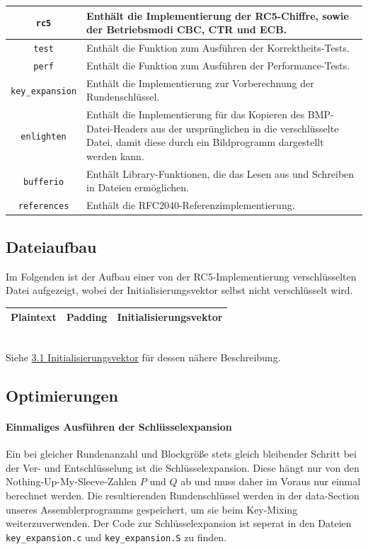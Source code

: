 \documentclass[course=erap]{aspdoc}
\begin{document}
\begin{center}
\begin{tabular}{ |c|m{10cm}| }
\hline
\texttt{rc5} & Enthält die Implementierung der RC5-Chiffre, sowie der Betriebsmodi CBC, CTR und ECB. \\
\hline
\texttt{test} & Enthält die Funktion zum Ausführen der Korrektheits-Tests. \\
\hline
\texttt{perf} & Enthält die Funktion zum Ausführen der Performance-Tests. \\
\hline
\texttt{key\_expansion} & Enthält die Implementierung zur Vorberechnung der Rundenschlüssel. \\
\hline
\texttt{enlighten} & Enthält die Implementierung für das Kopieren des BMP-Datei-Headers aus der ursprünglichen in die verschlüsselte Datei, damit diese durch ein Bildprogramm dargestellt werden kann. \\
\hline
\texttt{bufferio} & Enthält Library-Funktionen, die das Lesen aus und Schreiben in Dateien ermöglichen. \\
\hline
\texttt{references} & Enthält die RFC2040-Referenzimplementierung. \\
\hline
\end{tabular}
\end{center}

\subsection{Dateiaufbau}
Im Folgenden ist der Aufbau einer von der RC5-Implementierung verschlüsselten Datei aufgezeigt,
wobei der Initialisierungsvektor selbst nicht verschlüsselt wird.\\[1.5mm]
\begin{tabularx}{\textwidth}{|X|X|X|}
    \hline
    \centering Plaintext & \centering Padding & \centering\arraybackslash Initialisierungsvektor\\
    \hline
\end{tabularx}\\[1.5mm]
Siehe \hyperref[sec:Initialisierungsvektor]{3.1 Initialisierungsvektor} für dessen nähere
Beschreibung.

\subsection{Optimierungen}

\paragraph{Einmaliges Ausführen der Schlüsselexpansion} Ein bei gleicher Rundenanzahl und Blockgröße stets gleich bleibender Schritt bei der Ver- und Entschlüsselung ist die Schlüsselexpansion. Diese hängt nur von den Nothing-Up-My-Sleeve-Zahlen $P$ und $Q$ ab und muss daher im Voraus nur einmal berechnet werden. Die resultierenden Rundenschlüssel werden in der data-Section unseres Assemblerprogramms gespeichert, um sie beim Key-Mixing weiterzuverwenden. Der Code zur Schlüsselexpansion ist seperat in den Dateien \texttt{key\_expansion.c} und \texttt{key\_expansion.S} zu finden.
\end{document}
